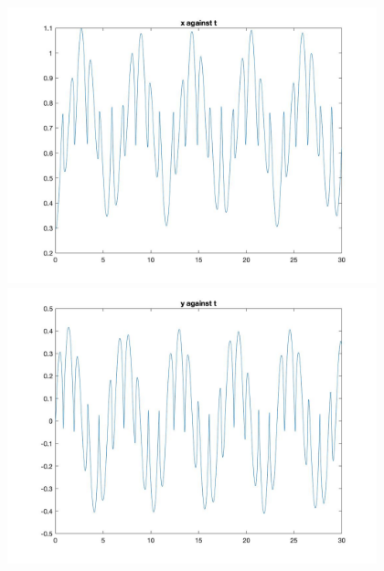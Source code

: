 \documentclass[11pt]{article}
\begin{document}
\begin{figure}[H]
\includegraphics[width = 12cm, height = 8cm]{Q4(7)}
\includegraphics[width = 12cm, height = 8cm]{Q4(8)}
\end{figure}
\end{document}

